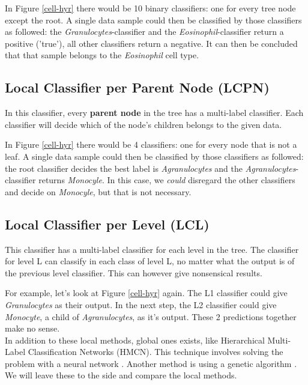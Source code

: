 \documentclass{article}
\begin{document}
In Figure \ref{cell-hyr} there would be 10 binary classifiers: one for every tree node except the root.
A single data sample could then be classified by those classifiers as followed: the \textit{Granulocytes}-classifier and the \textit{Eosinophil}-classifier return a positive ('true'), all other classifiers return a negative.
It can then be concluded that that sample belongs to the \textit{Eosinophil} cell type. 

\subsection{Local Classifier per Parent Node (LCPN)}
\label{LCPN}
In this classifier, every \textbf{parent node} in the tree has a multi-label classifier.
Each classifier will decide which of the node's children belongs to the given data.

In Figure \ref{cell-hyr} there would be 4 classifiers: one for every node that is not a leaf.
A single data sample could then be classified by those classifiers as followed: the  root classifier decides the best label is \textit{Agranulocytes} and the \textit{Agranulocytes}-classifier returns \textit{Monocyle}.
In this case, we \textit{could} disregard the other classifiers and decide on \textit{Monocyle}, but that is not necessary.

\subsection{Local Classifier per Level (LCL)}
\label{LCL}
This classifier has a multi-label classifier for each level in the tree. The classifier for level L can classify in each class of level L, no matter what the output is of the previous level classifier. This can however give nonsensical results. 

For example, let's look at Figure \ref{cell-hyr} again. The L1 classifier could give \textit{Granulocytes} as their output. In the next step, the L2 classifier could give \textit{Monocyte}, a child of  \textit{Agranulocytes}, as it's output. These 2 predictions together make no sense. \\

In addition to these local methods, global ones exists, like Hierarchical Multi-Label Classification Networks (HMCN). This technique involves solving the problem with a neural network \cite{hmcn}. Another method is using a genetic algorithm \cite{genetic}. We will leave these to the side and compare the local methods.
\end{document}
